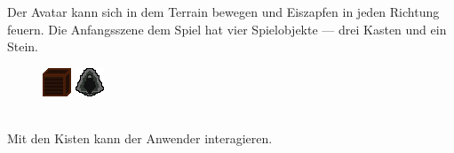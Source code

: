 \documentclass {article}
\begin{document}
Der Avatar kann sich in dem Terrain bewegen und Eiszapfen in jeden Richtung feuern. Die Anfangsszene dem Spiel hat vier Spielobjekte --- drei Kasten und ein Stein.\\
\begin{figure}[h]
  \includegraphics[scale=15]{Box}
  \includegraphics[scale=15]{Stone}
\end{figure} \\
Mit den Kisten kann der Anwender interagieren.
\end{document}
